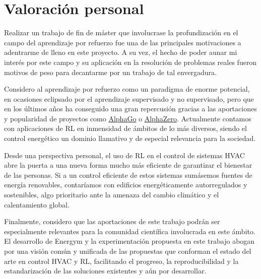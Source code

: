 \section{Valoración personal}

Realizar un trabajo de fin de máster que involucrase la profundización en el campo del aprendizaje por refuerzo fue una de las principales motivaciones a adentrarme de lleno en este proyecto. A su vez, el hecho de poder aunar mi interés por este campo y su aplicación en la resolución de problemas reales fueron motivos de peso para decantarme por un trabajo de tal envergadura. 

Considero al aprendizaje por refuerzo como un paradigma de enorme potencial, en ocasiones eclipsado por el aprendizaje supervisado y no supervisado, pero que en los últimos años ha conseguido una gran repercusión gracias a las aportaciones y popularidad de proyectos como \href{https://deepmind.com/research/case-studies/alphago-the-story-so-far}{AlphaGo} o \href{https://deepmind.com/blog/article/alphazero-shedding-new-light-grand-games-chess-shogi-and-go}{AlphaZero}. Actualmente contamos con aplicaciones de RL en inmensidad de ámbitos de lo más diversos, siendo el control energético un dominio llamativo y de especial relevancia para la sociedad.

Desde una perspectiva personal, el uso de RL en el control de sistemas HVAC abre la puerta a una nueva forma mucho más eficiente de garantizar el bienestar de las personas. Si a un control eficiente de estos sistemas sumásemos fuentes de energía renovables, contaríamos con edificios energéticamente autorregulados y sostenibles, algo prioritario ante la amenaza del cambio climático y el calentamiento global.
 
Finalmente, considero que las aportaciones de este trabajo podrán ser especialmente relevantes para la comunidad científica involucrada en este ámbito. El desarrollo de Energym y la experimentación propuesta en este trabajo abogan por una visión común y unificada de las propuestas que conforman el estado del arte en control HVAC y RL, facilitando el progreso, la reproducibilidad y la estandarización de las soluciones existentes y aún por desarrollar.


